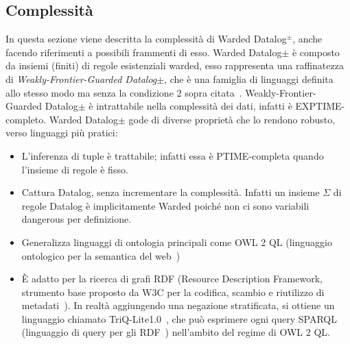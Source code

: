 \subsection{Complessità}

In questa sezione viene descritta la complessità di Warded Datalog$^\pm$, anche facendo riferimenti a possibili frammenti di esso. \newline
Warded Datalog$\pm$ è composto da insiemi (finiti) di regole esistenziali warded, esso rappresenta una raffinatezza di \textit{Weakly-Frontier-Guarded Datalog$\pm$}, che è una famiglia di linguaggi definita allo stesso modo ma senza la condizione 2 sopra citata~\cite{baget2011rules}.
Weakly-Frontier-Guarded Datalog$\pm$ è intrattabile nella complessità dei dati, infatti è EXPTIME-completo. \newline \newline
Warded Datalog$\pm$ gode di diverse proprietà che lo rendono robusto, verso linguaggi più pratici:
\begin{itemize}
	\item L'inferenza di tuple è trattabile; infatti essa è PTIME-completa quando l'insieme di regole è fisso.
	\item Cattura Datalog, senza incrementare la complessità. Infatti un insieme $\Sigma$ di regole Datalog è implicitamente Warded poiché non ci sono variabili dangerous per definizione.
	\item Generalizza linguaggi di ontologia principali come OWL 2 QL (linguaggio ontologico per la semantica del web~\cite{OWL2QL})
	\item È adatto per la ricerca di grafi RDF (Resource Description Framework, strumento base proposto da W3C per la codifica, scambio e riutilizzo di metadati~\cite{RDFW3C}). In realtà aggiungendo una negazione stratificata, si ottiene un linguaggio chiamato TriQ-Lite1.0~\cite{gottlob2015beyond}, che può esprimere ogni query SPARQL (linguaggio di query per gli RDF~\cite{SPARQLW3C}) nell'ambito del regime di OWL 2 QL.
\end{itemize}

